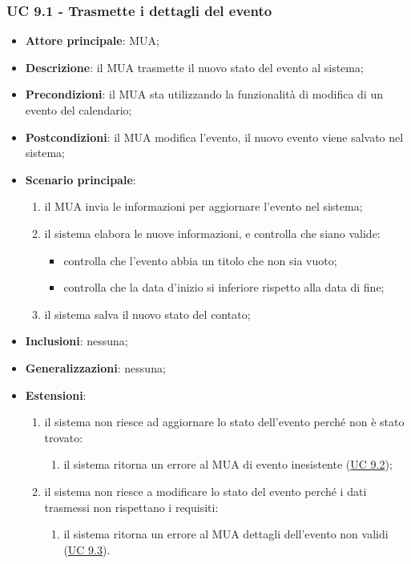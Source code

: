 \subsubsection{UC 9.1 - Trasmette i dettagli del evento} \label{sec:UC9.1}
    \begin{itemize}
        \item \textbf{Attore principale}: MUA;
        \item \textbf{Descrizione}: il MUA trasmette il nuovo stato del evento al sistema;
        \item \textbf{Precondizioni}: il MUA sta utilizzando la funzionalità di modifica di un evento del calendario;
        \item \textbf{Postcondizioni}: il MUA modifica l'evento, il nuovo evento viene salvato nel sistema;
        \item \textbf{Scenario principale}:
            \begin{enumerate}
                \item il MUA invia le informazioni per aggiornare l'evento nel sistema;
                \item il sistema elabora le nuove informazioni, e controlla che siano valide:
                \begin{itemize}
                    \item controlla che l'evento abbia un titolo che non sia vuoto;
                    \item controlla che la data d'inizio si inferiore rispetto alla data di fine;
                \end{itemize}
                \item il sistema salva il nuovo stato del contato;
            \end{enumerate}
        \item \textbf{Inclusioni}: nessuna;
        \item \textbf{Generalizzazioni}: nessuna;
        \item \textbf{Estensioni}: 
            \begin{enumerate}[label=\alph*.]
                \item il sistema non riesce ad aggiornare lo stato dell'evento perché non è stato trovato:
                \begin{enumerate}[label=\arabic*.]
                    \item il sistema ritorna un errore al MUA di evento inesistente (\hyperref[sec:UC9.2]{UC 9.2});
                \end{enumerate}
                \item il sistema non riesce a modificare lo stato del evento perché i dati trasmessi non rispettano i requisiti:
                \begin{enumerate}[label=\arabic*.]
                    \item il sistema ritorna un errore al MUA dettagli dell'evento non validi (\hyperref[sec:U9.3]{UC 9.3}).
                \end{enumerate}
            \end{enumerate}
    \end{itemize}

